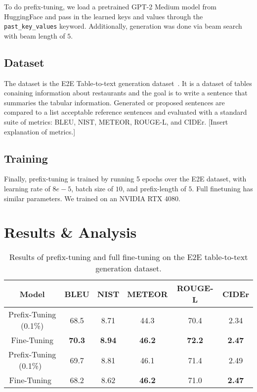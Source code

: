 \documentclass[11pt]{article} %
\begin{document}
To do prefix-tuning, we load a pretrained GPT-2 Medium model from HuggingFace and pass in the learned keys and values through the \verb|past_key_values| keyword. Additionally, generation was done via beam search with beam length of $5$.

\subsection{Dataset}
The dataset is the E2E Table-to-text generation dataset~\cite{novikova-etal-2017-e2e}. It is a dataset of tables conaining information about restaurants and the goal is to write a sentence that summaries the tabular information. Generated or proposed sentences are compared to a list acceptable reference sentences and evaluated with a standard suite of metrics: BLEU, NIST, METEOR, ROUGE-L, and CIDEr. [Insert explanation of metrics.]

\subsection{Training}
Finally, prefix-tuning is trained by running 5 epochs over the E2E dataset, with learning rate of $8e-5$, batch size of $10$, and prefix-length of $5$. Full finetuning has similar parameters. We trained on an NVIDIA RTX 4080.

\section{Results \& Analysis}

\begin{table}[H]
    \centering
    \begin{tabular}{c|ccccc}
        \textbf{Model} & \textbf{BLEU} & \textbf{NIST} & \textbf{METEOR} & \textbf{ROUGE-L} & \textbf{CIDEr} \\
        \hline
        Prefix-Tuning (0.1\%) & 68.5 & 8.71 & 44.3 & 70.4 & 2.34 \\
        Fine-Tuning & \textbf{70.3} & \textbf{8.94} & \textbf{46.2} & \textbf{72.2} & \textbf{2.47}\\
        Prefix-Tuning (0.1\%)~\cite{li-liang-2021-prefix}  & 69.7 & 8.81 & 46.1 & 71.4 & 2.49 \\
        Fine-Tuning~\cite{li-liang-2021-prefix} & 68.2 & 8.62 & \textbf{46.2} & {71.0} & \textbf{2.47}
    \end{tabular}
    \caption{Results of prefix-tuning and full fine-tuning on the E2E table-to-text generation dataset.}
    \label{tab:results}
\end{table}
\end{document}
